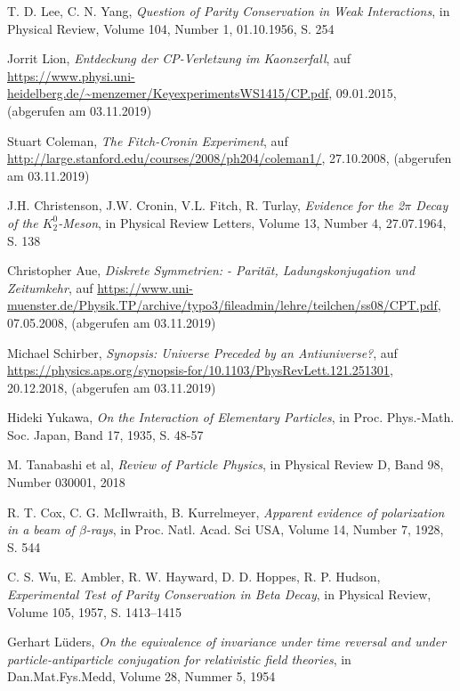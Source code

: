 \documentclass[12pt,a4paper]{scrartcl}
\numberwithin{equation}{section}
\begin{document}
\begin{thebibliography}{99}

  T. D. Lee, C. N. Yang,
  \textit{Question of Parity Conservation in Weak Interactions},
  in Physical Review,
  Volume 104,
  Number 1,
  01.10.1956,
  S. 254

  Jorrit Lion,
  \textit{Entdeckung der CP-Verletzung im Kaonzerfall},
  auf \url{https://www.physi.uni-heidelberg.de/~menzemer/KeyexperimentsWS1415/CP.pdf},
  09.01.2015,
  (abgerufen am 03.11.2019)

  Stuart Coleman,
  \textit{The Fitch-Cronin Experiment},
  auf \url{http://large.stanford.edu/courses/2008/ph204/coleman1/},
  27.10.2008,
  (abgerufen am 03.11.2019)

  J.H. Christenson, J.W. Cronin, V.L. Fitch, R. Turlay,
  \textit{Evidence for the 2$\pi$ Decay of the $K^{0}_{2}$-Meson},
  in Physical Review Letters,
  Volume 13,
  Number 4,
  27.07.1964,
  S. 138

  Christopher Aue,
  \textit{Diskrete Symmetrien: - Parität, Ladungskonjugation und Zeitumkehr},
  auf \url{https://www.uni-muenster.de/Physik.TP/archive/typo3/fileadmin/lehre/teilchen/ss08/CPT.pdf},
  07.05.2008,
  (abgerufen am 03.11.2019)

  Michael Schirber,
  \textit{Synopsis: Universe Preceded by an Antiuniverse?},
  auf \url{https://physics.aps.org/synopsis-for/10.1103/PhysRevLett.121.251301},
  20.12.2018,
  (abgerufen am 03.11.2019)

  Hideki Yukawa,
  \textit{On the Interaction of Elementary Particles},
  in Proc. Phys.-Math. Soc. Japan,
  Band 17,
  1935,
  S. 48-57

  M. Tanabashi et al,
  \textit{Review of Particle Physics},
  in Physical Review D,
  Band 98,
  Number 030001,
  2018

  R. T. Cox, C. G. McIlwraith, B. Kurrelmeyer,
  \textit{Apparent evidence of polarization in a beam of $\beta$-rays},
  in Proc. Natl. Acad. Sci USA,
  Volume 14,
  Number 7,
  1928,
  S. 544

  C. S. Wu, E. Ambler, R. W. Hayward, D. D. Hoppes, R. P. Hudson,
  \textit{Experimental Test of Parity Conservation in Beta Decay},
  in Physical Review,
  Volume 105,
  1957,
  S. 1413–1415

  Gerhart Lüders,
  \textit{On the equivalence of invariance under time reversal and under particle-antiparticle conjugation for relativistic field theories},
  in Dan.Mat.Fys.Medd,
  Volume 28,
  Nummer 5,
  1954


\end{thebibliography}
\end{document}
